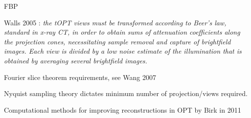 \documentclass[12pt]{article}
\begin{document}
FBP







Walls 2005 \cite{Walls:2005ja} : \textit{the tOPT views must be transformed according to Beer’s law, standard in x-ray CT, in order to obtain sums of attenuation coefficients along the projection cones, necessitating sample removal and capture of brightfield images. Each view is divided by a low noise estimate of the illumination that is obtained by averaging several brightfield images.}

Fourier slice theorem requirements, see Wang 2007 \cite{Wang:2007}

Nyquist sampling theory dictates minimum number of projection/views required.

Computational methods for improving reconstructions in OPT by Birk in 2011 \cite{Birk:2011}


\end{document}
